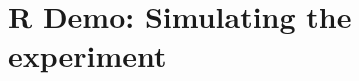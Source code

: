 \documentclass[slidestop,compress,mathserif]{beamer}
\makeatletter
\def\chpii@path{../../Chp 2}
\makeatother
\begin{document}
\section{R Demo: Simulating the experiment}













\end{document}
